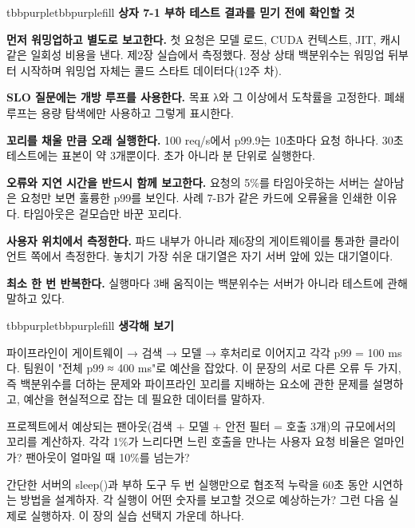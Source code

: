 \begin{calloutbox}{tbbpurple}{tbbpurplefill}
{\normalsize\bfseries\color{tbbx5B21B6}상자 7-1  부하 테스트 결과를 믿기 전에 확인할 것}\par\vspace{3pt}
\begin{tbbitemize}
  \item \textbf{먼저 워밍업하고 별도로 보고한다.} 첫 요청은 모델 로드, CUDA 컨텍스트, JIT, 캐시 같은 일회성 비용을 낸다. 제2장 실습에서 측정했다. 정상 상태 백분위수는 워밍업 뒤부터 시작하며 워밍업 자체는 콜드 스타트 데이터다(12주 차).
  \item \textbf{SLO 질문에는 개방 루프를 사용한다.} 목표 λ와 그 이상에서 도착률을 고정한다. 폐쇄 루프는 용량 탐색에만 사용하고 그렇게 표시한다.
  \item \textbf{꼬리를 채울 만큼 오래 실행한다.} 100 req/s에서 p99.9는 10초마다 요청 하나다. 30초 테스트에는 표본이 약 3개뿐이다. 초가 아니라 분 단위로 실행한다.
  \item \textbf{오류와 지연 시간을 반드시 함께 보고한다.} 요청의 5\%를 타임아웃하는 서버는 살아남은 요청만 보면 훌륭한 p99를 보인다. 사례 7-B가 같은 카드에 오류율을 인쇄한 이유다. 타임아웃은 겉모습만 바꾼 꼬리다.
  \item \textbf{사용자 위치에서 측정한다.} 파드 내부가 아니라 제6장의 게이트웨이를 통과한 클라이언트 쪽에서 측정한다. 놓치기 가장 쉬운 대기열은 자기 서버 앞에 있는 대기열이다.
  \item \textbf{최소 한 번 반복한다.} 실행마다 3배 움직이는 백분위수는 서버가 아니라 테스트에 관해 말하고 있다.
\end{tbbitemize}
\end{calloutbox}

\vspace{3.0pt}

\begin{calloutbox}{tbbpurple}{tbbpurplefill}
{\normalsize\bfseries\color{tbbpurple}생각해 보기}\par\vspace{3pt}
\begin{tbbitemize}
  \item 파이프라인이 게이트웨이 → 검색 → 모델 → 후처리로 이어지고 각각 p99 = 100 ms다. 팀원이 "전체 p99 ≈ 400 ms"로 예산을 잡았다. 이 문장의 서로 다른 오류 두 가지, 즉 백분위수를 더하는 문제와 파이프라인 꼬리를 지배하는 요소에 관한 문제를 설명하고, 예산을 현실적으로 잡는 데 필요한 데이터를 말하자.
  \item 프로젝트에서 예상되는 팬아웃(검색 + 모델 + 안전 필터 = 호출 3개)의 규모에서의 꼬리를 계산하자. 각각 1\%가 느리다면 느린 호출을 만나는 사용자 요청 비율은 얼마인가? 팬아웃이 얼마일 때 10\%를 넘는가?
  \item 간단한 서버의 sleep()과 부하 도구 두 번 실행만으로 협조적 누락을 60초 동안 시연하는 방법을 설계하자. 각 실행이 어떤 숫자를 보고할 것으로 예상하는가? 그런 다음 실제로 실행하자. 이 장의 실습 선택지 가운데 하나다.
\end{tbbitemize}
\end{calloutbox}


